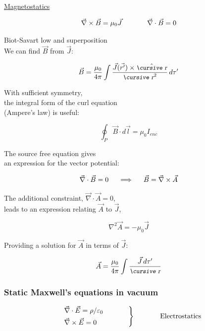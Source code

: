 \documentclass[12pt]{article}
\begin{document}
\begin{flushleft}
\begin{multicols}{2}
\columnbreak
\begin{center} \underline{Magnetostatics} \end{center}

\[
\vec{\nabla} \times \vec{B} = \mu_{0}\vec{J}  \hspace{.5in} \vec{\nabla} \cdot \vec{B}  = 0
\]

Biot-Savart low and superposition\\
We can find $\vec{B}$ from $\vec{J}$:

\[
\vec{B}  = \frac{ \mu_{0} }{4\pi} \int \frac{ \vec{J}( \vec{r^{\prime}} ) \times  \hat{\text{\small\slshape\cursive r}}}{\text{\small\slshape\cursive r}^{2}} \,  d\tau^{\prime} 
\]

\vspace{.2in}
With sufficient symmetry,\\
the integral form of the curl equation\\
(Ampere's law) is useful:

\[
\oint_{P} \vec{B} \cdot d\vec{l} = \mu_{0} I_{enc}
\]

\vspace{.2in}
The source free equation gives\\
 an expression for the vector potential:

\[
\vec{\nabla} \cdot \vec{B} = 0  \hspace{.2in} \Longrightarrow \hspace{.2in} \vec{B} = \vec{\nabla}  \times \vec{A}
\]

The additional constraint, $\vec{\nabla} \cdot \vec{A} =0$,\\
leads to an expression relating $\vec{A}$ to $\vec{J}$,

\[
\nabla^{2} \vec{A} = -\mu_{0}\vec{J}
\]

Providing a solution for $\vec{A}$ in terms of $\vec{J}$:

\[
\vec{A} = \frac{\mu_{0}}{4\pi} \int \frac{\vec{J} \, d\tau^{\prime}}{\text{\small\slshape\cursive r}} 
\]
\end{multicols}


\subsubsection*{\bf Static Maxwell's equations in vacuum}

\begin{equation*}
\begin{rcases}
& \vec{\nabla} \cdot \vec{E}  = \rho/\varepsilon_{0} \hspace{.5in} \\ 
& \vec{\nabla} \times \vec{E} = 0
\end{rcases}
\hspace{.5in} \text{Electrostatics}
\end{equation*}


\end{flushleft}
\end{document}
